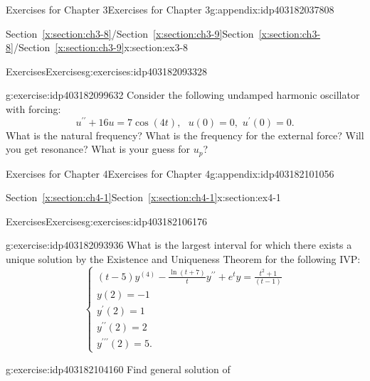 \documentclass[oneside,10pt,]{book}
\newcommand{\xreffont}{\relax}
\numberwithin{equation}{section}
\numberwithin{equation}{section}
\begin{document}
\begin{appendixptx}{Exercises for Chapter 3}{}{Exercises for Chapter 3}{}{}{g:appendix:idp403182037808}
\begin{sectionptx}{Section~{\xreffont\ref*{x:section:ch3-8}}\slash{}Section~{\xreffont\ref*{x:section:ch3-9}}}{}{Section~{\xreffont\ref*{x:section:ch3-8}}\slash{}Section~{\xreffont\ref*{x:section:ch3-9}}}{}{}{x:section:ex3-8}
\begin{exercises-subsection-numberless}{Exercises}{}{Exercises}{}{}{g:exercises:idp403182093328}
\begin{divisionexercise}{4}{}{}{g:exercise:idp403182099632}
Consider the following undamped harmonic oscillator with forcing:%
\begin{equation*}
u^{\prime\prime}+16u=7\cos\left(4t\right),\,\,\,\,u(0)=0,\,\,u^{\prime}(0)=0.
\end{equation*}
What is the natural frequency? What is the frequency for the external force? Will you get resonance? What is your guess for \(u_{p}\)?%
\end{divisionexercise}%
\end{exercises-subsection-numberless}
\end{sectionptx}
\end{appendixptx}
%
%
\typeout{************************************************}
\typeout{************************************************}
%
\begin{appendixptx}{Exercises for Chapter 4}{}{Exercises for Chapter 4}{}{}{g:appendix:idp403182101056}
%
%
\typeout{************************************************}
\typeout{Section E.1 Section~{\xreffont\ref*{x:section:ch4-1}}}
\typeout{************************************************}
%
\begin{sectionptx}{Section~{\xreffont\ref*{x:section:ch4-1}}}{}{Section~{\xreffont\ref*{x:section:ch4-1}}}{}{}{x:section:ex4-1}
%
%
\typeout{************************************************}
\typeout{************************************************}
%
\begin{exercises-subsection-numberless}{Exercises}{}{Exercises}{}{}{g:exercises:idp403182106176}
\begin{divisionexercise}{1}{}{}{g:exercise:idp403182093936}%
What is the largest interval for which there exists a unique solution by the Existence and Uniqueness Theorem for the following IVP:%
\begin{equation*}
\begin{cases}
\left(t-5\right)y^{(4)}-\frac{\ln\left(t+7\right)}{t}y^{\prime\prime}+e^{t}y=\frac{t^{2}+1}{\left(t-1\right)}\\
y(2)=-1\\
y^{\prime}(2)=1\\
y^{\prime\prime}(2)=2\\
y^{\prime\prime\prime}(2)=5.
\end{cases}
\end{equation*}
%
\end{divisionexercise}%
\begin{divisionexercise}{2}{}{}{g:exercise:idp403182104160}%
Find general solution of%

\end{divisionexercise}
\end{exercises-subsection-numberless}
\end{sectionptx}
\end{appendixptx}
\end{document}
